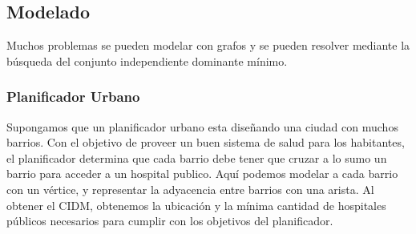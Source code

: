 \newpage

\subsection{Modelado}
Muchos problemas se pueden modelar con grafos y se pueden resolver mediante la búsqueda del conjunto independiente dominante mínimo.

\subsubsection{Planificador Urbano}

Supongamos que un planificador urbano esta diseñando una ciudad con muchos barrios. Con el objetivo de proveer un buen sistema de salud para los habitantes, el planificador determina que cada barrio debe tener que cruzar a lo sumo un barrio para acceder a un hospital publico. Aquí podemos modelar a cada barrio con un vértice, y representar la adyacencia entre barrios con una arista. Al obtener el CIDM, obtenemos la ubicación y la mínima cantidad de hospitales públicos necesarios para cumplir con los objetivos del planificador.